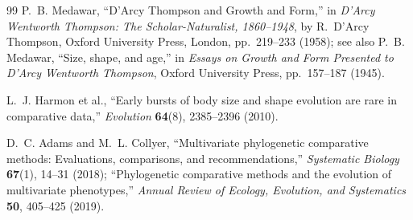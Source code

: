 \documentclass[11pt,a4paper]{article}
\theoremstyle{definition}
\theoremstyle{remark}
\begin{document}
\begin{thebibliography}{99}
P.~B. Medawar, ``D'Arcy Thompson and Growth and Form,'' in \emph{D'Arcy Wentworth Thompson: The Scholar-Naturalist, 1860--1948}, by R.~D'Arcy Thompson, Oxford University Press, London, pp.\ 219--233 (1958); see also P.~B. Medawar, ``Size, shape, and age,'' in \emph{Essays on Growth and Form Presented to D'Arcy Wentworth Thompson}, Oxford University Press, pp.\ 157--187 (1945).

L.~J. Harmon et al., ``Early bursts of body size and shape evolution are rare in comparative data,'' \emph{Evolution} \textbf{64}(8), 2385--2396 (2010).

D.~C. Adams and M.~L. Collyer, ``Multivariate phylogenetic comparative methods: Evaluations, comparisons, and recommendations,'' \emph{Systematic Biology} \textbf{67}(1), 14--31 (2018); ``Phylogenetic comparative methods and the evolution of multivariate phenotypes,'' \emph{Annual Review of Ecology, Evolution, and Systematics} \textbf{50}, 405--425 (2019).

\end{thebibliography}
\end{document}
